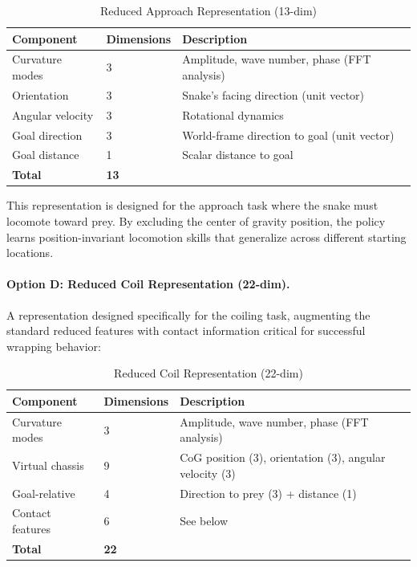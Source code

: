 \documentclass[11pt]{article}
\begin{document}
\begin{table}[H]
\centering
\caption{Reduced Approach Representation (13-dim)}
\begin{tabular}{@{}lll@{}}
\toprule
\textbf{Component} & \textbf{Dimensions} & \textbf{Description} \\
\midrule
Curvature modes & 3 & Amplitude, wave number, phase (FFT analysis) \\
Orientation & 3 & Snake's facing direction (unit vector) \\
Angular velocity & 3 & Rotational dynamics \\
Goal direction & 3 & World-frame direction to goal (unit vector) \\
Goal distance & 1 & Scalar distance to goal \\
\midrule
\textbf{Total} & \textbf{13} & \\
\bottomrule
\end{tabular}
\end{table}

This representation is designed for the approach task where the snake must locomote toward prey. By excluding the center of gravity position, the policy learns position-invariant locomotion skills that generalize across different starting locations.

\paragraph{Option D: Reduced Coil Representation (22-dim).}
A representation designed specifically for the coiling task, augmenting the standard reduced features with contact information critical for successful wrapping behavior:

\begin{table}[H]
\centering
\caption{Reduced Coil Representation (22-dim)}
\begin{tabular}{@{}lll@{}}
\toprule
\textbf{Component} & \textbf{Dimensions} & \textbf{Description} \\
\midrule
Curvature modes & 3 & Amplitude, wave number, phase (FFT analysis) \\
Virtual chassis & 9 & CoG position (3), orientation (3), angular velocity (3) \\
Goal-relative & 4 & Direction to prey (3) + distance (1) \\
Contact features & 6 & See below \\
\midrule
\textbf{Total} & \textbf{22} & \\
\bottomrule
\end{tabular}
\end{table}
\end{document}
